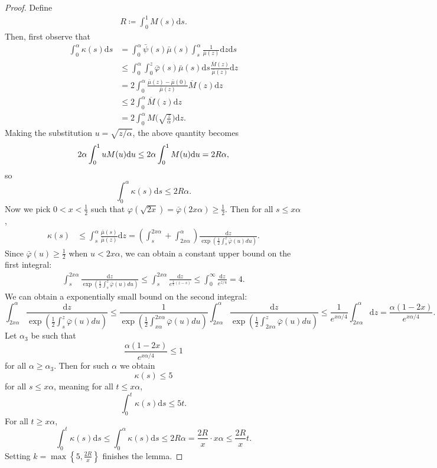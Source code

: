 \documentclass{article}
\begin{document}
\begin{proof}
    Define
    \begin{align*}
        R\coloneqq \int_0^1M(s)\mathrm{d}s.
    \end{align*}
    Then, first observe that
    \begin{align*}
        \int_0^\alpha \kappa(s)\mathrm{d}s &= \int_0^\alpha \bar\psi(s)\bar\mu(s)\int_s^\alpha\frac{1}{\bar\mu(z)}\mathrm{d}z\mathrm{d}s \\
        &\leq \int_{0}^\alpha\int_{0}^z\bar\varphi(s)\bar\mu(s)\mathrm{d}s\frac{\overline M(z)}{\bar\mu(z)}\mathrm{d}z \\
        &=2\int_0^\alpha\frac{\bar\mu(z)-\bar\mu(0)}{\bar\mu(z)}\overline M(z)\mathrm{d}z\\
        &\leq 2\int_0^\alpha \overline M(z)\mathrm{d}z \\
        &= 2\int_0^\alpha M\biggl(\sqrt{\frac z\alpha}\biggr)\mathrm{d}z.
    \end{align*}
    Making the substitution $u = \sqrt{z/\alpha}$, the above quantity becomes
    \begin{align*}
        2\alpha\int_0^1uM(u)\textrm du\leq 2\alpha\int_0^1 M(u)\textrm{d}u = 2R\alpha,
    \end{align*}
    so
    \[\int_0^\alpha\kappa(s)\mathrm{d}s \leq 2R\alpha.\]
    Now we pick $0<x<\frac12$ such that $\varphi(\sqrt{2x})=\bar\varphi(2x\alpha)\geq \frac 12$. Then for all $s\leq x\alpha$,
    \begin{align*}
        \kappa(s) &\leq \int_s^{\alpha}\frac{\bar\mu(s)}{\bar\mu(z)}\mathrm{d}z =\left(\int_s^{2x\alpha}+\int_{2x\alpha}^\alpha\right) \frac{\mathrm{d}z}{\exp\left(\frac 12\int_s^z \bar\varphi(u)du\right)}.
    \end{align*}
    Since $\bar\varphi(u)\geq \frac 12$ when $u<2x\alpha$, we can obtain a constant upper bound on the first integral:
    \begin{align*}
        \int_s^{2x\alpha}\frac{\mathrm{d}z}{\exp\left(\frac 12\int_s^z \bar\varphi(u)du\right)} \leq \int_s^{2x\alpha}\frac{\mathrm{d}z}{e^{\frac 14(z-s)}} \leq \int_0^{\infty}\frac{\mathrm{d}z}{e^{z/4}} = 4.
    \end{align*}
    We can obtain a exponentially small bound on the second integral:
    \[\int_{2x\alpha}^\alpha\frac{\mathrm{d}z}{\exp(\frac 12\int_s^z\bar\varphi(u)du)} \leq \frac 1{\exp(\frac 12\int_{x\alpha}^{2x\alpha}\bar\varphi(u)du)}\int_{2x\alpha}^\alpha\frac{\mathrm{d}z}{\exp(\frac 12\int_{2x\alpha}^z\bar\varphi(u)du)}\leq \frac 1{e^{x\alpha/4}}\int_{2x\alpha}^\alpha \mathrm{d}z = \frac{\alpha(1-2x)}{e^{x\alpha/4}}.\]
    Let $\alpha_3$ be such that \[\frac{\alpha(1-2x)}{e^{x\alpha/4}}\leq 1\] for all $\alpha \geq \alpha_3$. Then for such $\alpha$ we obtain
    \[\kappa(s)\leq 5\]
    for all $s\leq x\alpha$, meaning for all $t\leq x\alpha$,
    \[\int_0^t\kappa(s)\mathrm{d}s\leq 5t.\]
    For all $t\geq x\alpha$,
    \[\int_0^t\kappa(s) \mathrm{d}s \leq \int_0^\alpha \kappa(s)\mathrm{d}s \leq 2R\alpha = \frac {2R}x\cdot x\alpha\leq \frac {2R}xt.\]
    Setting $k = \max\left\{5, \frac {2R}x\right\}$ finishes the lemma.
\end{proof}
\end{document}
